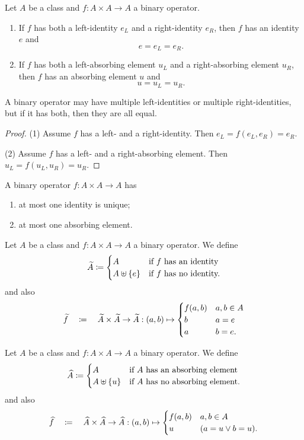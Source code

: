 \begin{lemma} \label{leftRightIdentity}
Let $A$ be a class and $f: A\times A \to A$ a binary operator.
\begin{enumerate}
\item If $f$ has both a left-identity $e_L$ and a right-identity $e_R$, then $f$ has an identity $e$ and
\[ e = e_L = e_R. \]
\item If $f$ has both a left-absorbing element $u_L$ and a right-absorbing element $u_R$, then $f$ has an absorbing element $u$ and
\[ u = u_L = u_R. \]
\end{enumerate}
A binary operator may have multiple left-identities or multiple right-identities, but if it has both, then they are all equal.
\end{lemma}
\begin{proof}
(1) Assume $f$ has a left- and a right-identity. Then $e_L = f(e_L, e_R) = e_R$.

(2) Assume $f$ has a left- and a right-absorbing element. Then $u_L = f(u_L, u_R) = u_R$.
\end{proof}
\begin{corollary} \label{identityAbsorbingElementUnique}
A binary operator $f:A\times A\to A$ has
\begin{enumerate}
\item at most one identity is unique;
\item at most one absorbing element.
\end{enumerate}
\end{corollary}

\begin{definition}
Let $A$ be a class and $f: A\times A \to A$ a binary operator. We define
\[ \widetilde{A} \coloneqq \begin{cases}
A & \text{if $f$ has an identity} \\
A\uplus \{e\} & \text{if $f$ has no identity.}
\end{cases} \]
and also
\[ \widetilde{f} \quad\coloneqq\quad \widetilde{A}\times \widetilde{A}\to \widetilde{A}: (a,b) \mapsto \begin{cases}
f(a, b) & a,b\in A \\
b & a = e \\
a & b = e.
\end{cases} \]
\end{definition}

\begin{definition}
Let $A$ be a class and $f: A\times A \to A$ a binary operator. We define
\[ \widehat{A} \coloneqq \begin{cases}
A & \text{if $A$ has an absorbing element} \\
A\uplus \{u\} & \text{if $A$ has no absorbing element.}
\end{cases} \]
and also
\[ \widehat{f} \quad\coloneqq\quad \widehat{A}\times \widehat{A}\to \widehat{A}: (a,b) \mapsto \begin{cases}
f(a, b) & a,b\in A \\
u & (a = u \lor b = u).
\end{cases} \]
\end{definition}

